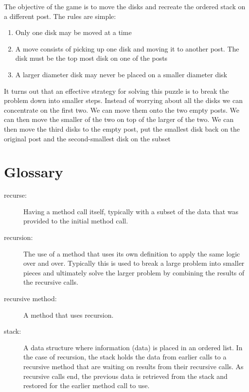 The objective of the game is to move the disks and recreate the ordered stack on a different post. The rules are simple:

\begin{enumerate}
	\item Only one disk may be moved at a time
	\item A move consists of picking up one disk and moving it to another post. The disk must be the top most disk on one of the posts
	\item A larger diameter disk may never be placed on a smaller diameter disk
\end{enumerate}

It turns out that an effective strategy for solving this puzzle is to break the problem down into smaller steps. Instead of worrying about all the disks we can concentrate on the first two. We can move them onto the two empty posts. We can then move the smaller of the two on top of the larger of the two. We can then move the third disks to the empty post, put the smallest disk back on the original post and the second-smallest disk on the  
subset 

\fi

\section{Glossary}

\begin{description}

\item[recurse:] Having a method call itself, typically with a subset of the data that was provided to the initial method call. 

\item[recursion:] The use of a method that uses its own definition to apply the same logic over and over. Typically this is used to break a large problem into smaller pieces and ultimately solve the larger problem by combining the results of the recursive calls.

\item[recursive method:] A method that uses recursion.

\item[stack:] A data structure where information (data) is placed in an ordered list. In the case of recursion, the stack holds the data from earlier calls to a recursive method that are waiting on results from their recursive calls. As recursive calls end, the previous data is retrieved from the stack and restored for the earlier method call to use.

\end{description}

